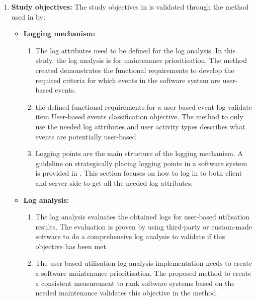 \begin{enumerate}[label=\textbf{\Roman*.}]
	\item \textbf{Study objectives:} The study objectives in  is validated through the method used in  by:
		\begin{itemize}
			\item \textbf{Logging mechanism:}
			  \begin{enumerate}
				\item The log attributes need to be defined for the log analysis. In this study, the log analysis is for maintenance prioritisation. The method created demonstrates the functional requirements to develop the required criteria for which events in the software system are user-based events.
				\item the defined functional requirements for a user-based event log validate item User-based events classification objective. The method to only use the needed log attributes and user activity types describes what events are potentially user-based.
				\item Logging points are the main structure of the logging mechanism. A guideline on strategically placing logging points in a software system is provided in . This section focuses on how to log in to both client and server side to get all the needed log attributes.
			  \end{enumerate}

			\item \textbf{Log analysis:}
			 \begin{enumerate}
				\item The log analysis evaluates the obtained logs for user-based utilisation results. The evaluation is proven by using third-party or custom-made software to do a comprehensive log analysis to validate if this objective has been met.
				\item The user-based utilisation log analysis implementation needs to create a software maintenance prioritisation. The proposed method to create a consistent measurement to rank software systems based on the needed maintenance validates this objective in the method.
			 \end{enumerate}
		\end{itemize}


\end{enumerate}
